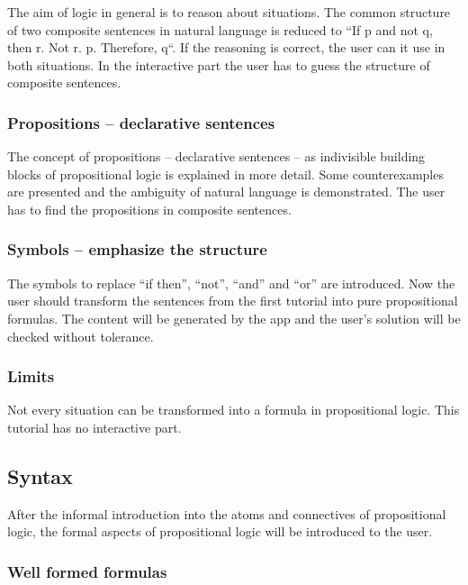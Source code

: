 The aim of logic in general is to reason about situations.\cite{Huth:2004:LCS:975331} 
The common structure of two composite sentences in natural language 
is reduced to “If p and not q, then r. Not r. p. Therefore, q“. 
If the reasoning is correct, the user can it use in both situations.
In the interactive part the user has to guess the structure of composite sentences. 

\subsubsection{Propositions – declarative sentences}

The concept of propositions – declarative sentences – 
as indivisible building blocks of propositional logic 
is explained in more detail. Some counterexamples are presented 
and the ambiguity of natural language is demonstrated.
The user has to find the propositions in composite sentences. 

\subsubsection{Symbols – emphasize the structure}

The symbols to replace “if then”, “not”, “and” and “or” are introduced. 
Now the user should transform the sentences from the first tutorial into pure propositional formulas. 
The content will be generated by the app and the user's solution will be checked without tolerance.

\subsubsection{Limits}

Not every situation can be transformed into a formula in propositional logic. 
This tutorial has no interactive part.

\subsection{Syntax}

After the informal introduction into the atoms and connectives of propositional logic, 
the formal aspects of propositional logic will be introduced to the user.

\subsubsection{Well formed formulas}

